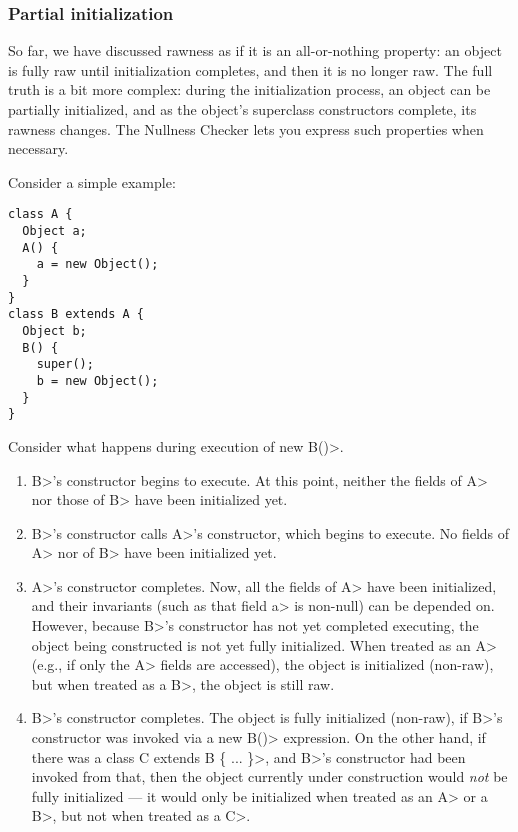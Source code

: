 

\subsubsection{Partial initialization\label{rawness-partial-initialization}}

So far, we have discussed rawness as if it is an all-or-nothing property:
an object is fully raw until initialization completes, and then it is no
longer raw.  The full truth is a bit more complex:  during the
initialization process, an object can be partially initialized, and as the
object's superclass constructors complete, its rawness changes.  The
Nullness Checker lets you express such properties when necessary.

Consider a simple example:

\begin{Verbatim}
class A {
  Object a;
  A() {
    a = new Object();
  }
}
class B extends A {
  Object b;
  B() {
    super();
    b = new Object();
  }
}
\end{Verbatim}

Consider what happens during execution of \<new B()>.

\begin{enumerate}
\item \<B>'s constructor begins to execute.  At this point, neither the
  fields of \<A> nor those of \<B> have been initialized yet.
\item \<B>'s constructor calls \<A>'s constructor, which begins to execute.
  No fields of \<A> nor of \<B> have been initialized yet.
\item \<A>'s constructor completes.  Now, all the fields of \<A> have been
  initialized, and their invariants (such as that field \<a> is non-null) can be
  depended on.  However, because \<B>'s constructor has not yet completed
  executing, the object being constructed is not yet fully initialized.
  When treated as an \<A> (e.g., if only the \<A> fields are accessed), the
  object is initialized (non-raw), but when treated as a \<B>, the object
  is still raw.
\item \<B>'s constructor completes.  The object is fully initialized
  (non-raw), if \<B>'s constructor was invoked via a \<new B()>
  expression.  On the other hand, if there was a \<class C extends B \{
  ... \}>, and \<B>'s constructor had been invoked from that, then the
  object currently under construction would \emph{not} be fully initialized
  --- it would only be initialized when treated as an \<A> or a \<B>, but
  not when treated as a \<C>.
\end{enumerate}

